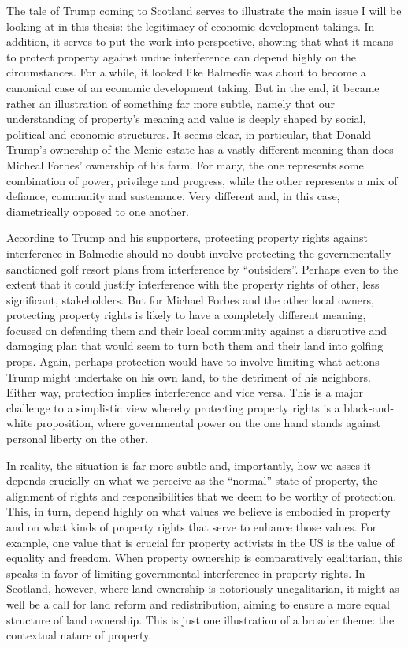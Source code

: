 The tale of Trump coming to Scotland serves to illustrate the main issue I will be looking at in this thesis: the legitimacy of economic development takings. In addition, it serves to put the work into perspective, showing that what it means to protect property against undue interference can depend highly on the circumstances. For a while, it looked like Balmedie was about to become a canonical case of an economic development taking. But in the end, it became rather an illustration of something far more subtle, namely that our understanding of property's meaning and value is deeply shaped by social, political and economic structures. It seems clear, in particular, that Donald Trump's ownership of the Menie estate has a vastly different meaning than does Micheal Forbes' ownership of his farm. For many, the one represents some combination of power, privilege and progress, while the other represents a mix of defiance, community and sustenance. Very different and, in this case, diametrically opposed to one another. 

According to Trump and his supporters, protecting property rights against interference in Balmedie should no doubt involve protecting the governmentally sanctioned golf resort plans from interference by ``outsiders''. Perhaps even to the extent that it could justify interference with the property rights of other, less significant, stakeholders. But for Michael Forbes and the other local owners, protecting property rights is likely to have a completely different meaning, focused on defending them and their local community against a disruptive and damaging plan that would seem to turn both them and their land into golfing props. Again, perhaps protection would have to involve limiting what actions Trump might undertake on his own land, to the detriment of his neighbors. Either way, protection implies interference and vice versa. This is a major challenge to a simplistic view whereby protecting property rights is a black-and-white proposition, where governmental power on the one hand stands against personal liberty on the other. 

In reality, the situation is far more subtle and, importantly, how we asses it depends crucially on what we perceive as the ``normal'' state of property, the alignment of rights and responsibilities that we deem to be worthy of protection. This, in turn, depend highly on what values we believe is embodied in property and on what kinds of property rights that serve to enhance those values. For example, one value that is crucial for property activists in the US is the value of equality and freedom. When property ownership is comparatively egalitarian, this speaks in favor of limiting governmental interference in property rights. In Scotland, however, where land ownership is notoriously unegalitarian, it might as well be a call for land reform and redistribution, aiming to ensure a more equal structure of land ownership. This is just one illustration of a broader theme: the contextual nature of property.


